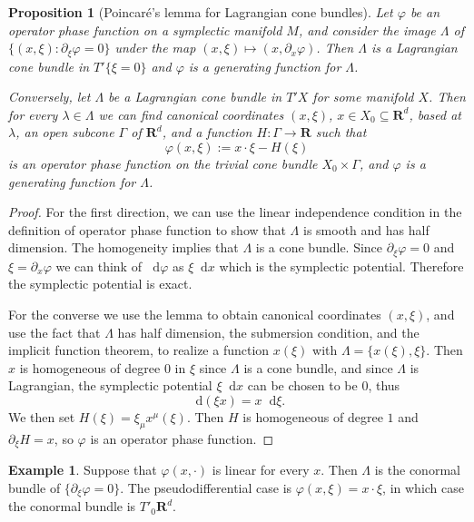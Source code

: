 \documentclass[reqno,12pt,letterpaper]{amsart}
\newcommand{\RR}{\mathbf{R}}
\newcommand*\dif{\mathop{}\!\mathrm{d}}
\newtheorem{proposition}[theorem]{Proposition}
\theoremstyle{definition}
\newtheorem{example}[theorem]{Example}
\numberwithin{equation}{section}
\begin{document}
\begin{proposition}[Poincar\'e's lemma for Lagrangian cone bundles]
Let $\varphi$ be an operator phase function on a symplectic manifold $M$, and consider the image $\Lambda$ of $\{(x, \xi): \partial_\xi \varphi = 0\}$ under the map $(x, \xi) \mapsto (x, \partial_x \varphi)$.
Then $\Lambda$ is a Lagrangian cone bundle in $T' \{\xi = 0\}$ and $\varphi$ is a generating function for $\Lambda$.

Conversely, let $\Lambda$ be a Lagrangian cone bundle in $T'X$ for some manifold $X$.
Then for every $\lambda \in \Lambda$ we can find canonical coordinates $(x, \xi)$, $x \in X_0 \subseteq \RR^d$, based at $\lambda$, an open subcone $\Gamma$ of $\RR^d$, and a function $H: \Gamma \to \RR$ such that
\begin{equation}\label{canonical form of generating function}
\varphi(x, \xi) := x \cdot \xi - H(\xi)
\end{equation}
is an operator phase function on the trivial cone bundle $X_0 \times \Gamma$, and $\varphi$ is a generating function for $\Lambda$.
\end{proposition}
\begin{proof}
For the first direction, we can use the linear independence condition in the definition of operator phase function to show that $\Lambda$ is smooth and has half dimension.
The homogeneity implies that $\Lambda$ is a cone bundle.
Since $\partial_\xi \varphi = 0$ and $\xi = \partial_x \varphi$ we can think of $\dif \varphi$ as $\xi \dif x$ which is the symplectic potential.
Therefore the symplectic potential is exact.

For the converse we use the lemma to obtain canonical coordinates $(x, \xi)$, and use the fact that $\Lambda$ has half dimension, the submersion condition, and the implicit function theorem, to realize a function $x(\xi)$ with $\Lambda = \{x(\xi), \xi\}$.
Then $x$ is homogeneous of degree $0$ in $\xi$ since $\Lambda$ is a cone bundle, and since $\Lambda$ is Lagrangian, the symplectic potential $\xi \dif x$ can be chosen to be $0$, thus 
$$\dif(\xi x) = x \dif \xi.$$
We then set $H(\xi) = \xi_\mu x^\mu(\xi)$. Then $H$ is homogeneous of degree $1$ and $\partial_\xi H = x$, so $\varphi$ is an operator phase function.
\end{proof}

\begin{example}
Suppose that $\varphi(x, \cdot)$ is linear for every $x$. Then $\Lambda$ is the conormal bundle of $\{\partial_\xi \varphi = 0\}$.
The pseudodifferential case is $\varphi(x, \xi) = x \cdot \xi$, in which case the conormal bundle is $T'_0 \RR^d$.
\end{example}
\end{document}
